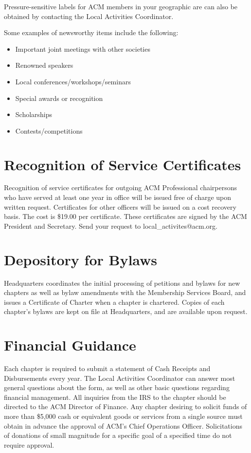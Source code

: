 Pressure-sensitive labels for ACM members in your geographic are can also be obtained by contacting the Local Activities Coordinator.

Some examples of newsworthy items include the following:
\begin{itemize}
	\item Important joint meetings with other societies
	\item Renowned speakers
	\item Local conferences/workshops/seminars
	\item Special awards or recognition
	\item Scholarships
	\item Contests/competitions
\end{itemize}

\section*{Recognition of Service Certificates}
Recognition of service certificates for outgoing ACM Professional chairpersons who have served at least one year in office will be issued free of charge upon written request. Certificates for other officers will be issued on a cost recovery basis. The cost is \$19.00 per certificate. These certificates are signed by the ACM President and Secretary. Send your request to local\_activites@acm.org.

\section*{Depository for Bylaws}
Headquarters coordinates the initial processing of petitions and bylaws for new chapters as well as bylaw amendments with the Membership Services Board, and issues a Certificate of Charter when a chapter is chartered. Copies of each chapter's bylaws are kept on file at Headquarters, and are available upon request.

\section*{Financial Guidance}
Each chapter is required to submit a statement of Cash Receipts and Disbursements every year. The Local Activities Coordinator can answer most general questions about the form, as well as other basic questions regarding financial management. All inquiries from the IRS to the chapter should be directed to the ACM Director of Finance. Any chapter desiring to solicit funds of more than \$5,000 cash or equivalent goods or services from a single source must obtain in advance the approval of ACM's Chief Operations Officer. Solicitations of donations of small magnitude for a specific goal of a specified time do not require approval.


\
